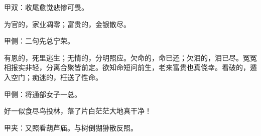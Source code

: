 \begin{qute}
    \begin{note}甲双：收尾愈觉悲惨可畏。\end{note}
    为官的，家业凋零；富贵的，金银散尽。\begin{note}甲侧：二句先总宁荣。\end{note}有恩的，死里逃生；无情的，分明照应。欠命的，命已还；欠泪的，泪已尽。冤冤相报实非轻，分离合聚皆前定。欲知命短问前生，老来富贵也真侥幸。看破的，遁入空门；痴迷的，枉送了性命。\begin{note}甲侧：将通部女子一总。\end{note}好一似食尽鸟投林，落了片白茫茫大地真干净！\begin{note}甲夹：又照看葫芦庙。与树倒猢狲散反照。\end{note}
\end{qute}


